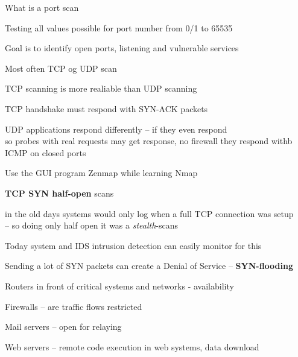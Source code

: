 \documentclass[Screen16to9,17pt]{foils}
\begin{document}
\begin{list1}
\item What is a port scan
\item Testing all values possible for port number from 0/1 to 65535
\item Goal is to identify open ports, listening and vulnerable services
\item Most often TCP og UDP scan
\item TCP scanning is more realiable than UDP scanning
\item TCP handshake must respond with SYN-ACK packets
\item UDP applications respond differently -- if they even respond\\
so probes with real requests may get response, no firewall they respond withb ICMP on closed ports
\item Use the GUI program Zenmap while learning Nmap
\end{list1}



\begin{list2}
\item {\bfseries TCP SYN half-open} scans
\item in the old days systems would only log when a full TCP connection was setup\\
  -- so doing only half open it was a \emph{stealth}-scans
\item Today system and IDS intrusion detection can easily monitor for this
\item Sending a lot of SYN packets can create a Denial of Service -- {\bfseries SYN-flooding}
\end{list2}



\begin{list2}
\item Routers in front of critical systems and networks - availability
\item Firewalls -- are traffic flows restricted
\item Mail servers -- open for relaying
\item Web servers -- remote code execution in web systems, data download
\end{list2}
\end{document}
